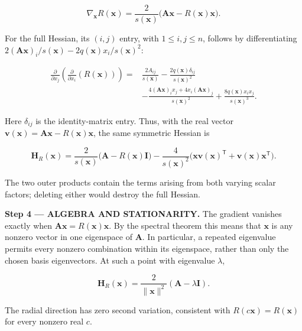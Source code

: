 \documentclass[11pt,oneside,openany]{book}
\begin{document}
\[
\nabla_{\mathbf x}R(\mathbf x)
=\frac{2}{s(\mathbf x)}\bigl(\mathbf A\mathbf x-R(\mathbf x)\mathbf x\bigr).
\]

For the full Hessian, its \((i,j)\) entry, with \(1\le i,j\le n\), follows by differentiating \(2(\mathbf A\mathbf x)_i/s(\mathbf x)-2q(\mathbf x)x_i/s(\mathbf x)^2\):

\[
\begin{aligned}
\frac{\partial}{\partial x_j}\left(\frac{\partial}{\partial x_i}(R(\mathbf x))\right)
={}&\frac{2A_{ij}}{s(\mathbf x)}-\frac{2q(\mathbf x)\delta_{ij}}{s(\mathbf x)^2}\\
&-\frac{4(\mathbf A\mathbf x)_i x_j+4x_i(\mathbf A\mathbf x)_j}{s(\mathbf x)^2}
+\frac{8q(\mathbf x)x_ix_j}{s(\mathbf x)^3}.
\end{aligned}
\]

Here \(\delta_{ij}\) is the identity-matrix entry. Thus, with the real vector \(\mathbf v(\mathbf x)=\mathbf A\mathbf x-R(\mathbf x)\mathbf x\), the same symmetric Hessian is

\[
\mathbf H_R(\mathbf x)
=\frac{2}{s(\mathbf x)}\bigl(\mathbf A-R(\mathbf x)\mathbf I\bigr)
-\frac{4}{s(\mathbf x)^2}
\bigl(\mathbf x\mathbf v(\mathbf x)^{\mathsf T}+\mathbf v(\mathbf x)\mathbf x^{\mathsf T}\bigr).
\]

The two outer products contain the terms arising from both varying scalar factors; deleting either would destroy the full Hessian.

\begingroup\color{AlgebraBlue}
\textbf{Step 4 --- ALGEBRA AND STATIONARITY.} The gradient vanishes exactly when \(\mathbf A\mathbf x=R(\mathbf x)\mathbf x\). By the spectral theorem this means that \(\mathbf x\) is any nonzero vector in one eigenspace of \(\mathbf A\). In particular, a repeated eigenvalue permits every nonzero combination within its eigenspace, rather than only the chosen basis eigenvectors. At such a point with eigenvalue \(\lambda\),

\[
\mathbf H_R(\mathbf x)=\frac{2}{\|\mathbf x\|^2}(\mathbf A-\lambda\mathbf I).
\]

The radial direction has zero second variation, consistent with \(R(c\mathbf x)=R(\mathbf x)\) for every nonzero real \(c\).
\end{document}
